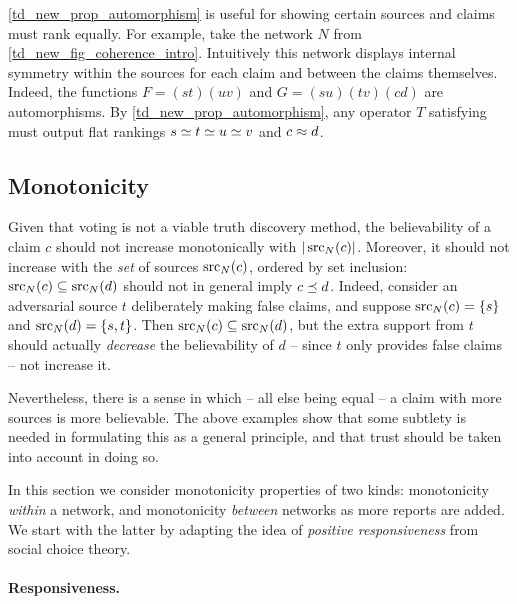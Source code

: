 \cref{td_new_prop_automorphism} is useful for showing certain sources and
claims must rank equally. For example, take the network $N$ from
\cref{td_new_fig_coherence_intro}. Intuitively this network displays internal
symmetry within the sources for each claim and between the claims themselves.
Indeed, the functions $F = (st)(uv)$ and $G = (su)(tv)(cd)$ are automorphisms.
By \cref{td_new_prop_automorphism}, any operator $T$ satisfying \symmetry{}
must output flat rankings $s \simeq t \simeq u \simeq v$ and $c \approx d$.

\subsection{Monotonicity}

Given that voting is not a viable truth discovery method, the believability of
a claim $c$ should not increase monotonically with $|\operatorname{src}_N(c)|$. Moreover, it
should not increase with the \emph{set} of sources $\operatorname{src}_N(c)$, ordered by set
inclusion: $\operatorname{src}_N(c) \subseteq \operatorname{src}_N(d)$ should not in general imply $c \preceq
d$. Indeed, consider an adversarial source $t$ deliberately making false
claims, and suppose $\operatorname{src}_N(c) = \{s\}$ and $\operatorname{src}_N(d) = \{s, t\}$. Then
$\operatorname{src}_N(c) \subseteq \operatorname{src}_N(d)$, but the extra support from $t$ should actually
\emph{decrease} the believability of $d$ -- since $t$ only provides false
claims -- not increase it.

Nevertheless, there is a sense in which -- all else being equal -- a claim with
more sources is more believable. The above examples show that some subtlety is
needed in formulating this as a general principle, and that trust should be
taken into account in doing so.

In this section we consider monotonicity properties of two kinds: monotonicity
\emph{within} a network, and monotonicity \emph{between} networks as more
reports are added. We start with the latter by adapting the idea of
\emph{positive responsiveness} from social choice theory.

\paragraph{Responsiveness.}

